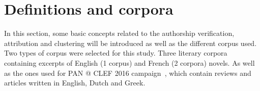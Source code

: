 \section{Definitions and corpora \label{sec:definitions_and_corpora}}

In this section, some basic concepts related to the authorship verification, attribution and clustering will be introduced as well as the different corpus used.
Two types of corpus were selected for this study.
Three literary corpora containing excerpts of English (1 corpus) and French (2 corpora) novels.
As well as the ones used for PAN @ CLEF 2016 campaign~\cite{pan16}, which contain reviews and articles written in English, Dutch and Greek.








